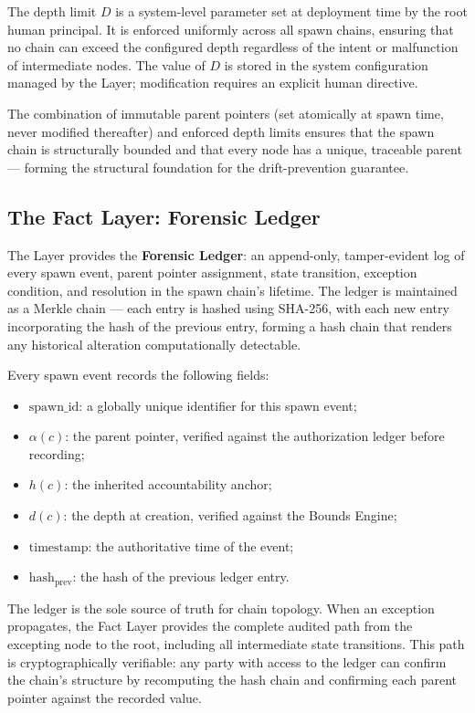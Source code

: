The depth limit $D$ is a system-level parameter set at deployment time by the root human principal. It is enforced uniformly across all spawn chains, ensuring that no chain can exceed the configured depth regardless of the intent or malfunction of intermediate nodes. The value of $D$ is stored in the system configuration managed by the \purpose{} Layer; modification requires an explicit human directive.

The combination of immutable parent pointers (set atomically at spawn time, never modified thereafter) and enforced depth limits ensures that the spawn chain is structurally bounded and that every node has a unique, traceable parent — forming the structural foundation for the drift-prevention guarantee.

\subsection{The Fact Layer: Forensic Ledger}
\label{sec:fact-fordic-ledger}

The \fact{} Layer provides the \textbf{Forensic Ledger}: an append-only, tamper-evident log of every spawn event, parent pointer assignment, state transition, exception condition, and resolution in the spawn chain's lifetime. The ledger is maintained as a Merkle chain — each entry is hashed using SHA-256, with each new entry incorporating the hash of the previous entry, forming a hash chain that renders any historical alteration computationally detectable.

Every spawn event records the following fields:

\begin{itemize}\itemsep0em
\item $\text{spawn\_id}$: a globally unique identifier for this spawn event;
\item $\alpha(c)$: the parent pointer, verified against the authorization ledger before recording;
\item $h(c)$: the inherited accountability anchor;
\item $d(c)$: the depth at creation, verified against the Bounds Engine;
\item $\text{timestamp}$: the authoritative time of the event;
\item $\text{hash}_{\text{prev}}$: the hash of the previous ledger entry.
\end{itemize}

The ledger is the sole source of truth for chain topology. When an exception propagates, the Fact Layer provides the complete audited path from the excepting node to the root, including all intermediate state transitions. This path is cryptographically verifiable: any party with access to the ledger can confirm the chain's structure by recomputing the hash chain and confirming each parent pointer against the recorded value.

